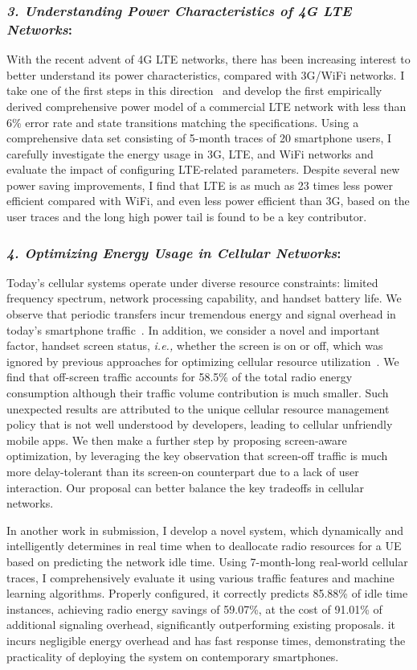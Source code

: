 \documentclass[10pt]{article}
\newcommand{\ie}{\emph{i.e.,}\xspace}
\begin{document}
\begin{small}
\subsubsection*{\emph{3. Understanding Power Characteristics of 4G LTE Networks}:}
With the recent advent of 4G LTE networks, there has been increasing interest to better understand its power characteristics, compared with 3G/WiFi networks. I take one of the first steps in this direction~\cite{huang12_mobisys} and develop the first empirically derived comprehensive power model of a commercial LTE network with less than 6\% error rate and state transitions matching the specifications. Using a comprehensive data set consisting of 5-month traces of 20 smartphone users, I carefully investigate the energy usage in 3G, LTE, and WiFi networks and evaluate the impact of configuring LTE-related parameters. Despite several new power saving improvements, I find that LTE is as much as 23 times less power efficient compared with WiFi, and even less power efficient than 3G, based on the user traces and the long high power tail is found to be a key contributor.

\subsubsection*{\emph{4. Optimizing Energy Usage in Cellular Networks}:}

Today’s cellular systems operate under diverse resource constraints: limited frequency spectrum, network processing capability, and handset battery life. We observe that periodic transfers incur tremendous energy and signal overhead in today's smartphone traffic~\cite{qian12_www}. In addition, we consider a novel and important factor, handset screen status, \ie whether the screen is on or off, which was ignored by previous approaches for optimizing cellular resource utilization~\cite{imc.screen}. We find that off-screen traffic accounts for 58.5\% of the total radio energy consumption although their traffic volume contribution is much smaller. Such unexpected results are attributed to the unique cellular resource management policy that is not well understood by developers, leading to cellular unfriendly mobile apps. We then make a further step by proposing screen-aware optimization, by leveraging the key observation that screen-off traffic is much more delay-tolerant than its screen-on counterpart due to a lack of user interaction. Our proposal can better balance the key tradeoffs in cellular networks. 

In another work in submission, I develop a novel system, which dynamically and intelligently determines in real time when to deallocate radio resources for a UE based on predicting the network idle time. Using 7-month-long real-world cellular traces, I comprehensively evaluate it using various traffic features and machine learning algorithms. Properly configured, it correctly predicts 85.88\% of idle time instances, achieving radio energy savings of 59.07\%, at the cost of 91.01\% of additional signaling overhead, significantly outperforming existing proposals.  it incurs negligible energy overhead and has fast response times, demonstrating the practicality of deploying the system on contemporary smartphones.


\end{small}
\end{document}
